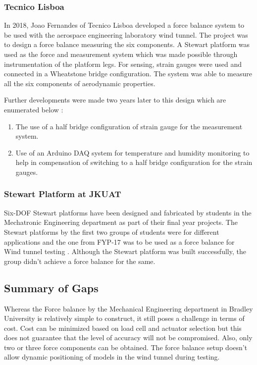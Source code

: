 \subsubsection{Tecnico Lisboa}
In 2018, Joao Fernandes of Tecnico Lisboa developed a force balance system to
be used with the aerospace engineering laboratory wind tunnel. The project was to
design a force balance measuring the six components. A Stewart platform was used as the
force and measurement system which was made possible through instrumentation of the platform legs.
For sensing, strain gauges were used and connected in a Wheatstone bridge configuration.
The system was able to measure all the six components of aerodynamic properties\cite{ferreira2015design}.

Further developments were made two years later to this design which are enumerated below \cite{ferreira2015design}:
\begin{enumerate}
	\item The use of a half bridge configuration of strain gauge for the measurement system.
	\item Use of an Arduino DAQ system for temperature and humidity monitoring to help in
	      compensation of switching to a half bridge configuration for the strain gauges.
\end{enumerate}
\subsubsection{Stewart Platform at JKUAT}
Six-DOF Stewart platforms have been designed and fabricated by students in the Mechatronic Engineering department as part of their final year projects. The Stewart platforms by the first two groups of students were for different applications and the one from FYP-17 was to be used as a force balance for Wind tunnel testing \cite{caleb}. Although the Stewart platform was built successfully, the group didn't achieve a force balance for the same.
\subsection{Summary of Gaps}
Whereas the Force balance by the Mechanical Engineering department in Bradley University is relatively simple to construct, it still poses a challenge in terms of cost. Cost can be minimized based on load cell and actuator selection but this does not guarantee that the level of accuracy will not be compromised. Also, only two or three force components can be obtained. The force balance setup doesn't allow dynamic positioning of models in the wind tunnel during testing.

